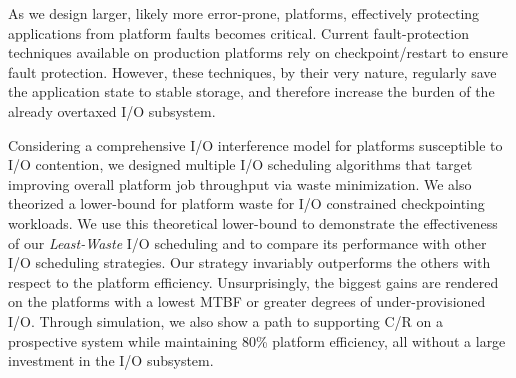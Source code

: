 \documentclass[two]{article}
\newcommand{\ie}[0]{\emph{i.e.}\xspace}
\newcommand{\leastwaste}{\emph{Least-Waste}\xspace}
\def\cooperative{\leastwaste}
\begin{document}
As we design larger, likely more error-prone, platforms, effectively protecting
applications from platform faults becomes critical. Current fault-protection
techniques available on production platforms rely on checkpoint/restart to
ensure fault protection. However, these techniques, by their very nature,
regularly save the application state to stable storage, and therefore increase
the burden of the already overtaxed I/O subsystem.

Considering a comprehensive I/O interference model for platforms susceptible to I/O
contention, we designed multiple I/O scheduling algorithms that target improving
overall platform job throughput via waste minimization. We also theorized a
lower-bound for platform waste for I/O constrained checkpointing workloads. We use
this theoretical lower-bound to demonstrate the effectiveness of our \cooperative
I/O scheduling and to compare its performance with other I/O
scheduling strategies.  Our strategy invariably outperforms the others
with respect to the platform efficiency. Unsurprisingly, the biggest gains are
rendered on the platforms with a lowest MTBF or greater degrees of under-provisioned
I/O. Through simulation, we also show a path to supporting C/R on a prospective
system while maintaining 80\% platform efficiency, all without a large
investment in the I/O subsystem.

\end{document}

